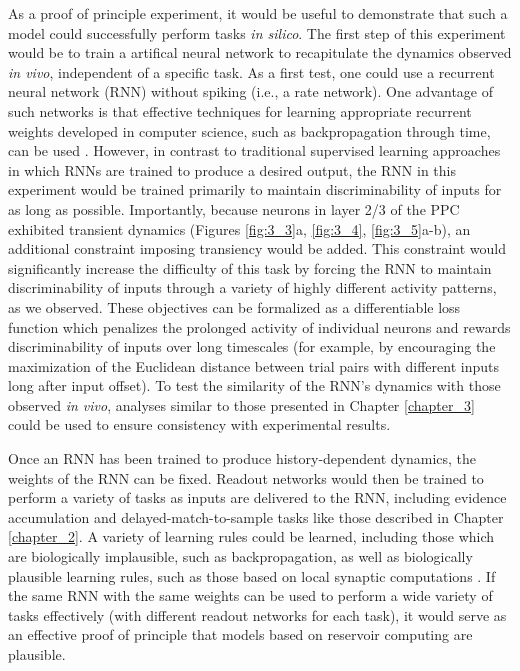 As a proof of principle experiment, it would be useful to demonstrate that such a model could successfully perform tasks \textit{in silico}. The first step of this experiment would be to train a artifical neural network to recapitulate the dynamics observed \textit{in vivo}, independent of a specific task. As a first test, one could use a recurrent neural network (RNN) without spiking (i.e., a rate network). One advantage of such networks is that effective techniques for learning appropriate recurrent weights developed in computer science, such as backpropagation through time, can be used \citep{LeCun:2015dt}. However, in contrast to traditional supervised learning approaches in which RNNs are trained to produce a desired output, the RNN in this experiment would be trained primarily to maintain discriminability of inputs for as long as possible.  Importantly, because neurons in layer 2/3 of the PPC exhibited transient dynamics (Figures \ref{fig:3_3}a, \ref{fig:3_4}, \ref{fig:3_5}a-b), an additional constraint imposing transiency would be added. This constraint would significantly increase the difficulty of this task by forcing the RNN to maintain discriminability of inputs through a variety of highly different activity patterns, as we observed. These objectives can be formalized as a differentiable loss function which penalizes the prolonged activity of individual neurons and rewards discriminability of inputs over long timescales (for example, by encouraging the maximization of the Euclidean distance between trial pairs with different inputs long after input offset). To test the similarity of the RNN's dynamics with those observed \textit{in vivo}, analyses similar to those presented in Chapter \ref{chapter_3} could be used to ensure consistency with experimental results. 

\bigskip
Once an RNN has been trained to produce history-dependent dynamics, the weights of the RNN can be fixed. Readout networks would then be trained to perform a variety of tasks as inputs are delivered to the RNN, including evidence accumulation and delayed-match-to-sample tasks like those described in Chapter \ref{chapter_2}. A variety of learning rules could be learned, including those which are biologically implausible, such as backpropagation, as well as biologically plausible learning rules, such as those based on local synaptic computations \citep{Legenstein:2014gp}. If the same RNN with the same weights can be used to perform a wide variety of tasks effectively (with different readout networks for each task), it would serve as an effective proof of principle that models based on reservoir computing are plausible. 

